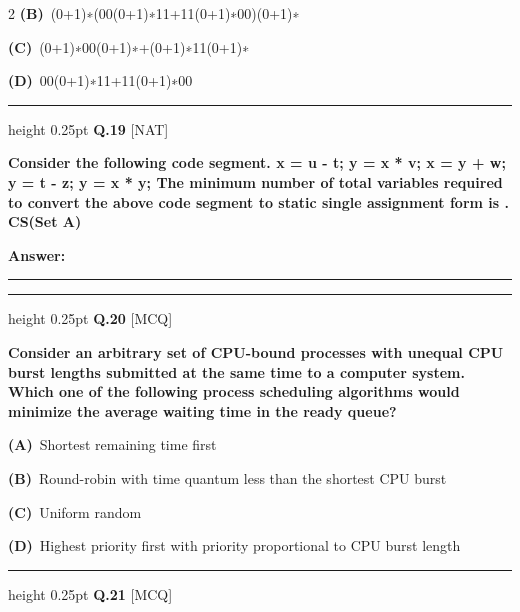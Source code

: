 \documentclass[a4paper,10pt,twoside]{article}
\begin{document}
\begin{multicols}{2}
\textbf{(B)}~(0+1)∗(00(0+1)∗11+11(0+1)∗00)(0+1)∗\par\vspace{2pt}\noindent
\textbf{(C)}~(0+1)∗00(0+1)∗+(0+1)∗11(0+1)∗\par\vspace{2pt}\noindent
\textbf{(D)}~00(0+1)∗11+11(0+1)∗00
\par\vspace{6pt}\hrule height 0.25pt\vspace{6pt}
\noindent\textbf{Q.19} \hfill {\footnotesize\textsf{[NAT]}}
\par\vspace{2pt}
{\bfseries Consider the following code segment.
x = u - t;
y = x * v;
x = y + w;
y = t - z;
y = x * y;
The minimum number of total variables required to convert the above code segment to static
single assignment form is
.
CS(Set A) \par}
\par\vspace{3pt}\noindent\textbf{Answer:} \rule{3.2cm}{0.4pt}
\par\vspace{6pt}\hrule height 0.25pt\vspace{6pt}
\noindent\textbf{Q.20} \hfill {\footnotesize\textsf{[MCQ]}}
\par\vspace{2pt}
{\bfseries Consider an arbitrary set of CPU-bound processes with unequal CPU burst lengths
submitted at the same time to a computer system.
Which one of the following process
scheduling algorithms would minimize the average waiting time in the ready queue? \par}
\par\vspace{2pt}\noindent
\textbf{(A)}~Shortest remaining time ﬁrst\par\vspace{2pt}\noindent
\textbf{(B)}~Round-robin with time quantum less than the shortest CPU burst\par\vspace{2pt}\noindent
\textbf{(C)}~Uniform random\par\vspace{2pt}\noindent
\textbf{(D)}~Highest priority ﬁrst with priority proportional to CPU burst length
\par\vspace{6pt}\hrule height 0.25pt\vspace{6pt}
\noindent\textbf{Q.21} \hfill {\footnotesize\textsf{[MCQ]}}
\par\vspace{2pt}

\end{multicols}
\end{document}
